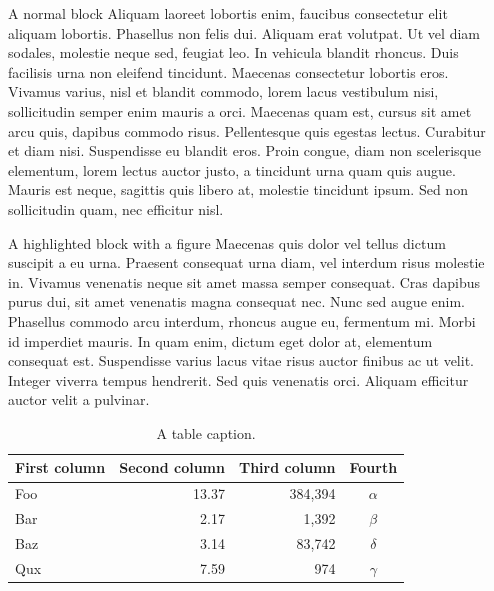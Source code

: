 \documentclass[final]{beamer}
\newlength{\sepwidth}
\newlength{\colwidth}
\newcommand{\separatorcolumn}{\begin{column}{\sepwidth}\end{column}}
\begin{document}
\begin{frame}[t]
\begin{columns}[t]
\separatorcolumn

\begin{column}{\colwidth}

  \begin{block}{A normal block}
    Aliquam laoreet lobortis enim, faucibus consectetur elit aliquam lobortis. Phasellus non felis dui. Aliquam erat volutpat. Ut vel diam sodales, molestie neque sed, feugiat leo. In vehicula blandit rhoncus. Duis facilisis urna non eleifend tincidunt. Maecenas consectetur lobortis eros. Vivamus varius, nisl et blandit commodo, lorem lacus vestibulum nisi, sollicitudin semper enim mauris a orci. Maecenas quam est, cursus sit amet arcu quis, dapibus commodo risus. Pellentesque quis egestas lectus. Curabitur et diam nisi. Suspendisse eu blandit eros. Proin congue, diam non scelerisque elementum, lorem lectus auctor justo, a tincidunt urna quam quis augue. Mauris est neque, sagittis quis libero at, molestie tincidunt ipsum. Sed non sollicitudin quam, nec efficitur nisl.
   

  \end{block}
  \begin{alertblock}{A highlighted block with a figure}
       Maecenas quis dolor vel tellus dictum suscipit a eu urna. Praesent consequat urna diam, vel interdum risus molestie in. Vivamus venenatis neque sit amet massa semper consequat. Cras dapibus purus dui, sit amet venenatis magna consequat nec. Nunc sed augue enim. Phasellus commodo arcu interdum, rhoncus augue eu, fermentum mi. Morbi id imperdiet mauris. In quam enim, dictum eget dolor at, elementum consequat est. Suspendisse varius lacus vitae risus auctor finibus ac ut velit. Integer viverra tempus hendrerit. Sed quis venenatis orci. Aliquam efficitur auctor velit a pulvinar. 
    \begin{table}
      \centering
       \caption{A table caption.}
      \begin{tabular}{l r r c}
        \toprule
        \textbf{First column} & \textbf{Second column} & \textbf{Third column} & \textbf{Fourth} \\
        \midrule
        Foo & 13.37 & 384,394 & $\alpha$ \\
        Bar & 2.17 & 1,392 & $\beta$ \\
        Baz & 3.14 & 83,742 & $\delta$ \\
        Qux & 7.59 & 974 & $\gamma$ \\
        \bottomrule
      \end{tabular}
     

\end{table}
\end{alertblock}
\end{column}
\end{columns}
\end{frame}
\end{document}
